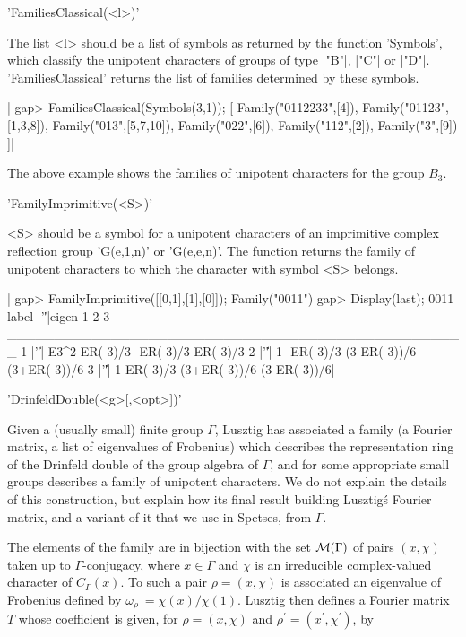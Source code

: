 'FamiliesClassical(<l>)'

The  list  <l>  should  be  a  list  of symbols as returned by the function
'Symbols', which classify the unipotent characters of groups of type |"B"|,
|"C"| or |"D"|. 'FamiliesClassical' returns the list of families determined
by these symbols.

|    gap> FamiliesClassical(Symbols(3,1));
    [ Family("0112233",[4]), Family("01123",[1,3,8]),
      Family("013",[5,7,10]), Family("022",[6]), Family("112",[2]),
      Family("3",[9]) ]|

The  above example shows the families of unipotent characters for the group
$B_3$.


'FamilyImprimitive(<S>)'

<S> should be a symbol for a unipotent characters of an imprimitive complex
reflection  group 'G(e,1,n)' or 'G(e,e,n)'. The function returns the family
of unipotent characters to which the character with symbol <S> belongs.

|    gap> FamilyImprimitive([[0,1],[1],[0]]);
    Family("0011")
    gap> Display(last);
    0011
    label |'\|'|eigen         1            2            3
    _________________________________________________
    1     |'\|'| E3^2  ER(-3)/3    -ER(-3)/3     ER(-3)/3
    2     |'\|'|    1 -ER(-3)/3 (3-ER(-3))/6 (3+ER(-3))/6
    3     |'\|'|    1  ER(-3)/3 (3+ER(-3))/6 (3-ER(-3))/6|


'DrinfeldDouble(<g>[,<opt>])'

Given  a (usually  small) finite  group $\Gamma$,  Lusztig has associated a
family  (a  Fourier  matrix,  a  list  of  eigenvalues  of Frobenius) which
describes  the  representation  ring  of  the  Drinfeld double of the group
algebra  of $\Gamma$,  and for  some appropriate  small groups  describes a
family  of  unipotent  characters.  We  do  not explain the details of this
construction,  but explain how its final result building Lusztig\'s Fourier
matrix, and a variant of it that we use in Spetses, from $\Gamma$.

The elements of the family are in bijection with the set ${\cal M}(\Gamma)$
of  pairs $(x,\chi)$ taken up to $\Gamma$-conjugacy, where $x\in\Gamma$ and
$\chi$ is an irreducible complex-valued character of $C_\Gamma(x)$. To such
a  pair $\rho=(x,\chi)$ is associated an eigenvalue of Frobenius defined by
$\omega_\rho\:=\chi(x)/\chi(1)$.  Lusztig then defines a Fourier matrix $T$
whose coefficient is given, for $\rho=(x,\chi)$ and $\rho^\prime=(x^\prime,
\chi^\prime)$, by\:

